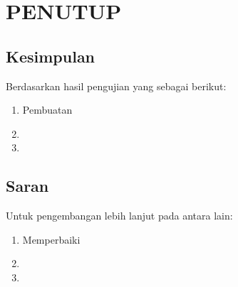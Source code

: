 \chapter{PENUTUP}
\label{chap:penutup}


\section{Kesimpulan}
\label{sec:kesimpulan}

Berdasarkan hasil pengujian yang \lipsum[1][1-3] sebagai berikut:

\begin{enumerate}[nolistsep]

  \item Pembuatan \lipsum[2][1-3]

  \item \lipsum[2][4-6]

  \item \lipsum[2][7-10]

\end{enumerate}

\section{Saran}
\label{chap:saran}

Untuk pengembangan lebih lanjut pada \lipsum[1][1-3] antara lain:

\begin{enumerate}[nolistsep]

  \item Memperbaiki \lipsum[2][1-3]

  \item \lipsum[2][4-6]

  \item \lipsum[2][7-10]

\end{enumerate}
